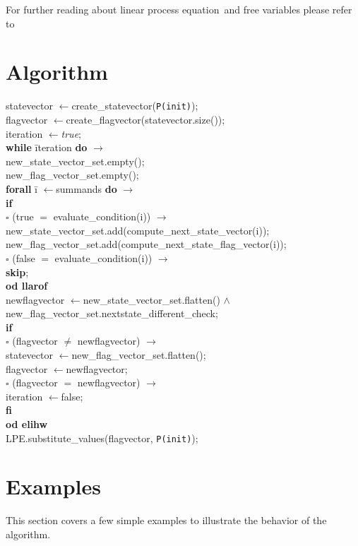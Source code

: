 \documentclass[a4paper,10pt]{article}
\newcommand{\lpe}{linear process equation}
\newcommand{\ti}{\textit}
\newcommand{\tb}{\textbf}
\newcommand{\la}{$\leftarrow$}
\newcommand{\ra}{$\rightarrow$}
\newcommand{\sq}{$\square$}
\newcommand{\csvs}{new\_state\_vector\_set}
\newcommand{\cfvs}{new\_flag\_vector\_set}
\begin{document}
For further reading about \lpe\ and free variables please refer to \cite{LPEfreevar} 

\section{Algorithm} \label{sec:alg}
\begin{tabbing} 
statevector \la create\_statevector(\verb"P(init)"); \\
flagvector \la create\_flagvector(statevector.size()); \\
iteration \la \ti{true}; \\
\tb{while} \= iteration \tb{do} \ra \\
  \> \csvs .empty(); \\
  \> \cfvs .empty(); \\
  \> \tb{forall} \= i \la summands \tb{do} \ra \\
  \>  \>   \tb{if} \= \\
  \>  \>   \sq \> (true $=$ evaluate\_condition(i)) \ra \\
  \>  \>       \> \csvs .add(compute\_next\_state\_vector(i)); \\
  \>  \>       \> \cfvs .add(compute\_next\_state\_flag\_vector(i)); \\
  \>  \>  \sq \>  (false $=$ evaluate\_condition(i)) \ra \\
  \>  \>  \> \tb{skip};\\
  \>  \tb{od llarof} \\
  \>  newflagvector \la \csvs .flatten() $\wedge$  \\
  \>  \> \cfvs .nextstate\_different\_check;\\
  \>  \tb{if}  \\
  \>  \sq  \> (flagvector $\neq$ newflagvector) \ra \\ 
  \>       \>	statevector \la \cfvs .flatten(); \\
  \>       \>     flagvector \la newflagvector; \\
  \>  \sq \>  (flagvector $=$ newflagvector) \ra  \\
  \>      \> iteration \la false;\\
  \>  \tb{fi} \\
  \tb{od elihw}\\
  LPE.substitute\_values(flagvector, \verb"P(init)");
\end{tabbing}

\section{Examples}
This section covers a few simple examples to illustrate the behavior of the algorithm. 
\end{document}
